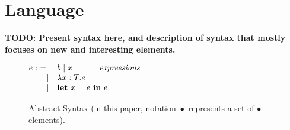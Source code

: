 \section{Language}
\label{sec:syntax}


{\bf TODO: Present syntax here, and description of syntax that mostly 
focuses on new and interesting elements.}

\begin{figure}[t]
\begin{center}
$\begin{array}{@{}l@{~}l@{\quad}l@{\!\!\!\!\!\!}r}
e &  ::= & b \mid x & \emph{expressions} \\
&\ \ \ \   \mid & \lambda x:T.e \\
&\ \ \ \   \mid & \textbf{let}~x=e~\textbf{in}~e \\
\end{array}
$
\end{center}
\caption{Abstract Syntax (in this paper, notation
$\overline{\bullet}$ represents a set of $\bullet$ elements).}
\label{fig-syntax}
\end{figure}



